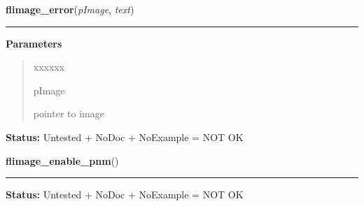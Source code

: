 \hspace{.8\funcindent}\begin{boxedminipage}{\funcwidth}

    \raggedright \textbf{flimage\_error}(\textit{pImage}, \textit{text})

    \vspace{-1.5ex}

    \rule{\textwidth}{0.5\fboxrule}
\setlength{\parskip}{2ex}
\setlength{\parskip}{1ex}
      \textbf{Parameters}
      \vspace{-1ex}

      \begin{quote}
        \begin{Ventry}{xxxxxx}

          \item[pImage]

          pointer to image

        \end{Ventry}

      \end{quote}

\textbf{Status:} Untested + NoDoc + NoExample = NOT OK



    \end{boxedminipage}

    \label{xformslib:library:flimage_enable_pnm}

    \vspace{0.5ex}

\hspace{.8\funcindent}\begin{boxedminipage}{\funcwidth}

    \raggedright \textbf{flimage\_enable\_pnm}()

    \vspace{-1.5ex}

    \rule{\textwidth}{0.5\fboxrule}
\setlength{\parskip}{2ex}
\setlength{\parskip}{1ex}
\textbf{Status:} Untested + NoDoc + NoExample = NOT OK



    \end{boxedminipage}

    \label{xformslib:library:flimage_set_fits_bits}

